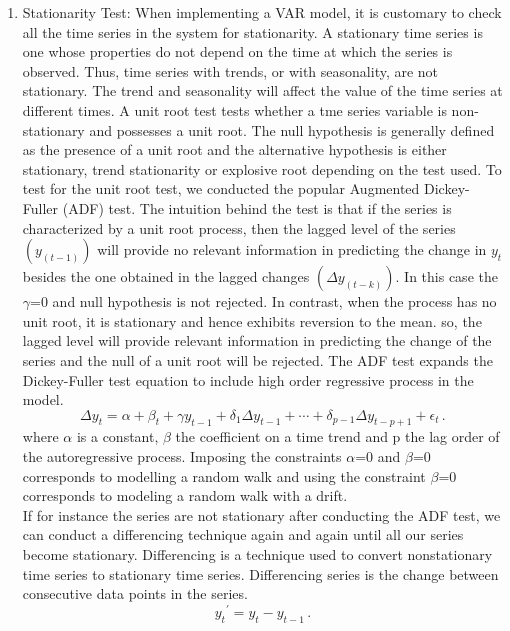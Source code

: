 \documentclass[12pt,italian, twoside]{report}
\begin{document}
\begin{enumerate}
\begin{enumerate}
	\item Stationarity Test: When implementing a VAR model, it is customary to check all the time series in the system for stationarity. A stationary time series is one whose properties do not depend on the time at which the series is observed. Thus, time series with trends, or with seasonality, are not stationary. The trend and seasonality will affect the value of the time series at different times. A unit root test tests whether a tme series variable is non-stationary and possesses a unit root. The null hypothesis is generally defined as the presence of a unit root and the alternative hypothesis is either stationary, trend stationarity or explosive root depending on the test used. To test for the unit root test, we conducted the popular Augmented Dickey-Fuller (ADF) test. The intuition behind the test is that if the series is characterized by a unit root process, then the lagged level of the series \((y_(t-1))\) will provide no relevant information in predicting the change in \(y_t\)  besides the one obtained in the lagged changes \(({\Delta y}_(t-k))\). In this case the $\gamma$=0 and null hypothesis is not rejected. In contrast, when the process has no unit root, it is stationary and hence exhibits reversion to the mean.  so, the lagged level will provide relevant information in predicting the change of the series and the null of a unit root will be rejected. The ADF test expands the Dickey-Fuller test equation to include high order regressive process in the model.
		\begin{equation}
	{\Delta y}_t= \alpha + \beta_t +{\gamma y}_{t-1} + \delta_1  \Delta y_{t-1 } +\cdots+ \delta_{p-1} \Delta y_{t-p+1} + \epsilon_t  \, .
\label{eq:DF}
\end{equation}
where \(\alpha\) is a constant, \(\beta\) the coefficient on a time trend and p the lag order of the autoregressive process. Imposing the constraints \(\alpha\)=0 and  \(\beta\)=0 corresponds to modelling a random walk and using the constraint  \(\beta\)=0 corresponds to modeling a random walk with a drift.
\\
If for instance the series are not stationary after conducting the ADF test, we can conduct a differencing technique again and again until all our series become stationary. Differencing is a technique used to convert nonstationary time series to stationary time series. Differencing series is the change between consecutive data points in the series.
	\begin{equation}
   y_t {^'} = y_t - y_{t-1}  \, .
 \label{eq:difference}

\end{equation}
\end{enumerate}
\end{enumerate}
\end{document}
